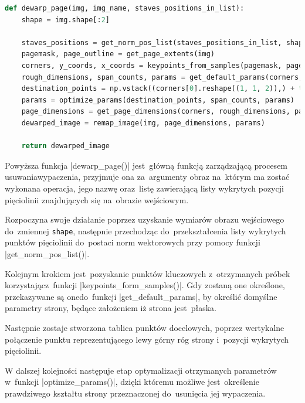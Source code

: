 \begin{lstlisting}[caption={\pyth|dewarp_page()| - główna funkcja usuwania wypaczania obrazu.}, label={dewarp-page}, language=Python]
def dewarp_page(img, img_name, staves_positions_in_list):
	shape = img.shape[:2]
	
	staves_positions = get_norm_pos_list(staves_positions_in_list, shape)
	pagemask, page_outline = get_page_extents(img)
	corners, y_coords, x_coords = keypoints_from_samples(pagemask, page_outline, staves_positions)
	rough_dimensions, span_counts, params = get_default_params(corners, y_coords, x_coords)
	destination_points = np.vstack((corners[0].reshape((1, 1, 2)),) + tuple(staves_positions))
	params = optimize_params(destination_points, span_counts, params)
	page_dimensions = get_page_dimensions(corners, rough_dimensions, params)
	dewarped_image = remap_image(img, page_dimensions, params)
	
	return dewarped_image
\end{lstlisting}

Powyższa funkcja \pyth|dewarp_page()| jest~główną funkcją zarządzającą procesem usuwania\linebreak wypaczenia, przyjmuje ona za~argumenty obraz na~którym ma zostać wykonana operacja, jego nazwę oraz~listę zawierającą listy wykrytych pozycji pięciolinii znajdujących się na~obrazie wejściowym.

Rozpoczyna swoje działanie poprzez uzyskanie wymiarów obrazu wejściowego do~zmiennej \linebreak \lstinline|shape|, następnie przechodząc do~przekształcenia listy wykrytych punktów pięciolinii do~postaci norm wektorowych przy pomocy funkcji \pyth|get_norm_pos_list()|.

Kolejnym krokiem jest~pozyskanie punktów kluczowych z~otrzymanych próbek korzystając\linebreak z~funkcji \pyth|keypoints_form_samples()|. Gdy zostaną one określone, przekazywane są one\linebreak do~funkcji \pyth|get_default_params|, by określić domyślne parametry strony, będące założeniem \linebreak iż strona jest~płaska.

Następnie zostaje stworzona tablica punktów docelowych, poprzez wertykalne połączenie punktu reprezentującego lewy górny róg strony i~pozycji wykrytych pięciolinii.

W dalszej kolejności następuje etap optymalizacji otrzymanych parametrów w~funkcji \linebreak\pyth|optimize_params()|, dzięki któremu możliwe jest~określenie prawdziwego kształtu strony przeznaczonej do~usunięcia jej wypaczenia.

